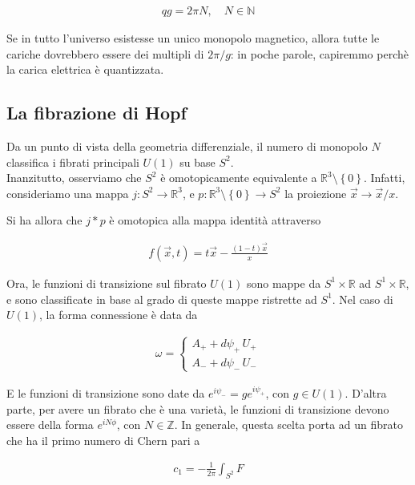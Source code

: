 \documentclass{report}
\begin{document}
\begin{align}
    qg = 2\pi N, \quad N \in \mathbb{N}
\end{align}

Se in tutto l'universo esistesse un unico monopolo magnetico, allora tutte le cariche dovrebbero essere dei multipli di \(2\pi /g\): in poche parole, capiremmo perchè la carica elettrica è quantizzata. 

\subsection{La fibrazione di Hopf}

Da un punto di vista della geometria differenziale, il numero di monopolo \(N\) classifica i fibrati principali \(U(1)\) su base \(S^2\). \\

Inanzitutto, osserviamo che \(S^2\) è omotopicamente equivalente a \(\mathbb{R}^3 \setminus \left\{0\right\}\). Infatti, consideriamo una mappa \(j: S^2 \rightarrow \mathbb{R}^3\), e \(p: \mathbb{R}^3 \setminus \left\{0\right\} \rightarrow S^2\) la proiezione \(\vec{x} \rightarrow \vec{x}/x\). 

Si ha allora che \(j * p\) è omotopica alla mappa identità attraverso 

\begin{align}
    f(\vec{x}, t) = t\vec{x} - \frac{(1-t)\vec{x}}{x}
\end{align}


Ora, le funzioni di transizione sul fibrato \(U(1)\) sono mappe da \(S^1 \times \mathbb{R}\) ad \(S^1 \times \mathbb{R}\), e sono classificate in base al grado di queste mappe ristrette ad \(S^1\). Nel caso di \(U(1)\), la forma connessione è data da 

\begin{align}
    \omega = \begin{cases}
        A_+ + d\psi_+ \, U_+ \\
        A_- + d\psi_- \, U_-
    \end{cases}
\end{align}

E le funzioni di transizione sono date da \(e^{i\psi_-} = ge^{i\psi_+}\), con \(g \in U(1)\). D'altra parte, per avere un fibrato che è una varietà, le funzioni di transizione devono essere della forma \(e^{iN\phi}\), con \(N \in \mathbb{Z}\). In generale, questa scelta porta ad un fibrato che ha il primo numero di Chern pari a 

\begin{align}
    c_1 = -\frac{1}{2\pi}\int_{S^2}F
\end{align}
\end{document}
